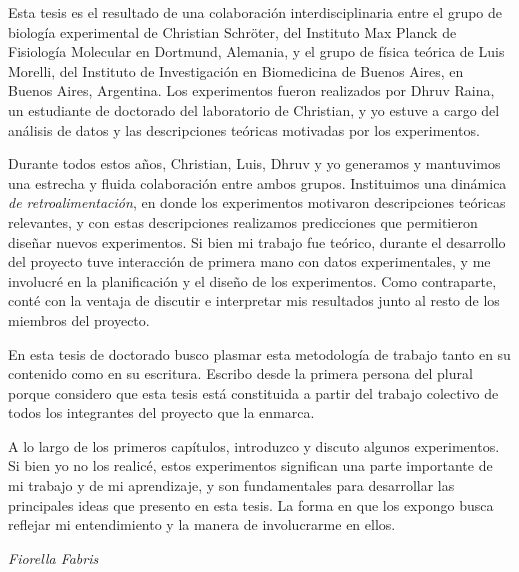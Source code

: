 \documentclass[./main.tex]{subfiles}
\begin{document}

Esta tesis es el resultado de una colaboración interdisciplinaria entre el grupo de biología experimental de Christian Schröter, del Instituto Max Planck de Fisiología Molecular en Dortmund, Alemania, y el grupo de física teórica de Luis Morelli, del Instituto de Investigación en Biomedicina de Buenos Aires, en Buenos Aires, Argentina. Los experimentos fueron realizados por Dhruv Raina, un estudiante de doctorado del laboratorio de Christian, y yo estuve a cargo del análisis de datos y las descripciones teóricas motivadas por los experimentos. 


Durante todos estos años, Christian, Luis, Dhruv y yo generamos y mantuvimos una estrecha y fluida colaboración entre ambos grupos. Instituimos una dinámica \textit{de retroalimentación}, en donde los experimentos motivaron descripciones teóricas relevantes, y con estas descripciones realizamos predicciones que permitieron diseñar nuevos experimentos. Si bien mi trabajo fue teórico, durante el desarrollo del proyecto tuve interacción de primera mano con datos experimentales, y me involucré en la planificación y el diseño de los experimentos. Como contraparte, conté con la ventaja de discutir e interpretar mis resultados junto al resto de los miembros del proyecto. 


En esta tesis de doctorado busco plasmar esta metodología de trabajo tanto en su contenido como en su escritura. Escribo desde la primera persona del plural porque considero que esta tesis está constituida a partir del trabajo colectivo de todos los integrantes del proyecto que la enmarca. 


A lo largo de los primeros capítulos, introduzco y discuto algunos experimentos. Si bien yo no los realicé, estos experimentos significan una parte importante de mi trabajo y de mi aprendizaje, y son fundamentales para desarrollar las principales ideas que presento en esta tesis. La forma en que los expongo busca reflejar mi entendimiento y la manera de involucrarme en ellos. 

\vspace{\baselineskip}

\begin{flushright}\noindent
{\it Fiorella Fabris}
\end{flushright}
\end{document}
